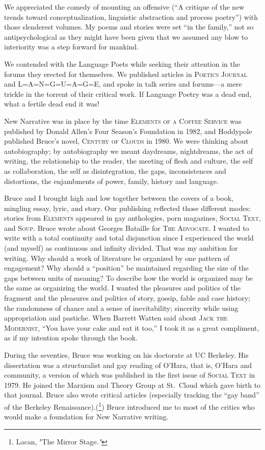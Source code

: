 \documentclass[
]{memoir}
\begin{document}
We appreciated the comedy of mounting an offensive (``A critique of the
new trends toward conceptualization, linguistic abstraction and process
poetry'') with those slenderest volumes. My poems and stories were set
``in the family,'' not so antipsychological as they might have been
given that we assumed any blow to interiority was a step forward for
mankind.

We contended with the Language Poets while seeking their attention in
the forums they erected for themselves. We published articles in
\textsc{Poetics Journal} and \textsc{L=A=N=G=U=A=G=E}, and spoke in talk
series and forums---a mere trickle in the torrent of their critical
work. If Language Poetry was a dead end, what a fertile dead end it was!

New Narrative was in place by the time \textsc{Elements of a Coffee
Service} was published by Donald Allen's Four Season's Foundation in
1982, and Hoddypole published Bruce's novel, \textsc{Century of Clouds}
in 1980. We were thinking about autobiography; by autobiography we meant
daydreams, nightdreams, the act of writing, the relationship to the
reader, the meeting of flesh and culture, the self as collaboration, the
self as disintegration, the gaps, inconsistences and distortions, the
enjambments of power, family, history and language.

Bruce and I brought high and low together between the covers of a book,
mingling essay, lyric, and story. Our publishing reflected those
different modes: stories from \textsc{Elements} appeared in gay
anthologies, porn magazines, \textsc{Social Text}, and \textsc{Soup}.
Bruce wrote about Georges Bataille for \textsc{The Advocate}\emph{. } I
wanted to write with a total continuity and total disjunction since I
experienced the world (and myself) as continuous and infinity divided.
That was my ambition for writing. Why should a work of literature be
organized by one pattern of engagement? Why should a ``position'' be
maintained regarding the size of the gaps between units of meaning? To
describe how the world is organized may be the same as organizing the
world. I wanted the pleasures and politics of the fragment and the
pleasures and politics of story, gossip, fable and case history; the
randomness of chance and a sense of inevitability; sincerity while using
appropriation and pastiche. When Barrett Watten said about \textsc{Jack
the Modernist}, ``You have your cake and eat it too,'' I took it as a
great compliment, as if my intention spoke through the book.

During the seventies, Bruce was working on his doctorate at UC Berkeley.
His dissertation was a structuralist and gay reading of O'Hara, that is,
O'Hara and community, a version of which was published in the first
issue of \textsc{Social Text} in 1979. He joined the Marxism and Theory
Group at St.~Cloud which gave birth to that journal. Bruce also wrote
critical articles (especially tracking the ``gay band'' of the Berkeley
Renaissance).(\footnote{Lacan, "The Mirror Stage.\emph{"}}) Bruce
introduced me to most of the critics who would make a foundation for New
Narrative writing.
\end{document}
